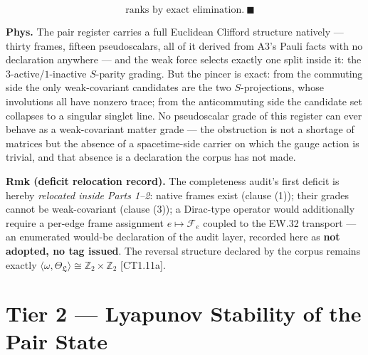 \begin{theorem}
\[
\quad \text{ranks by exact elimination}.\ \blacksquare
\]

\textbf{Phys.} The pair register carries a full Euclidean Clifford structure natively — thirty frames, fifteen pseudoscalars, all of it derived from A3's Pauli facts with no declaration anywhere — and the weak force selects exactly one split inside it: the $3$-active/$1$-inactive $S$-parity grading. But the pincer is exact: from the commuting side the only weak-covariant candidates are the two $S$-projections, whose involutions all have nonzero trace; from the anticommuting side the candidate set collapses to a singular singlet line. No pseudoscalar grade of this register can ever behave as a weak-covariant matter grade — the obstruction is not a shortage of matrices but the absence of a spacetime-side carrier on which the gauge action is trivial, and that absence is a declaration the corpus has not made.

\textbf{Rmk (deficit relocation record).} The completeness audit's first deficit is hereby \textit{relocated inside Parts 1–2}: native frames exist (clause (1)); their grades cannot be weak-covariant (clause (3)); a Dirac-type operator would additionally require a per-edge frame assignment $e\mapsto\mathcal F_e$ coupled to the EW.32 transport — an enumerated would-be declaration of the audit layer, recorded here as \textbf{not adopted, no tag issued}. The reversal structure declared by the corpus remains exactly $\langle\omega,\Theta_{\mathfrak L}\rangle\cong\mathbb Z_2\times\mathbb Z_2$ [CT1.11a].

\end{theorem}

\section[Tier 2 — Lyapunov Stability of the Pair State]{\texorpdfstring{Tier 2 — Lyapunov Stability of the Pair State}{Tier 2 - Lyapunov Stability of the Pair State}}

